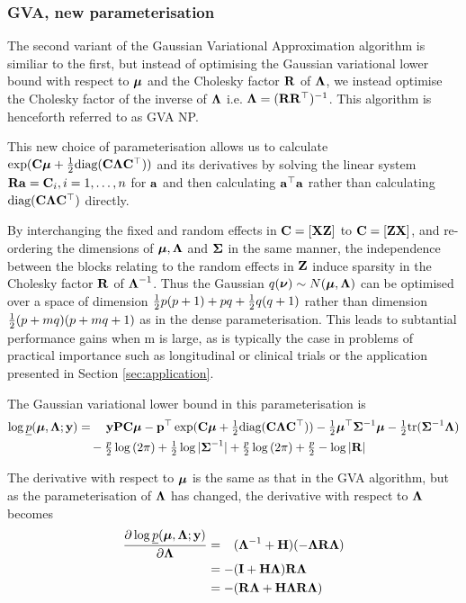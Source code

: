 \documentclass{article}[12pt]
\begin{document}
\subsubsection{GVA, new parameterisation}

The second variant of the Gaussian Variational Approximation algorithm is similiar to the first, but instead
of optimising the Gaussian variational lower bound with respect to ${\boldsymbol \mu}$ and the Cholesky factor ${\bf R}$ of
${\boldsymbol \Lambda}$, we instead optimise the Cholesky factor of the inverse of ${\boldsymbol \Lambda}$ i.e. ${\boldsymbol \Lambda} = ({\bf R}
{\bf R}^\top)^{-1}$. This algorithm is henceforth referred to as GVA NP.

This new choice of parameterisation allows us to calculate $\exp({\bf C} {\boldsymbol \mu} + {\tfrac{1}{2}} \text{diag}({\bf C} {\boldsymbol \Lambda}
{\bf C}^\top))$ and its derivatives by solving the linear system ${\bf R} {\bf a} = {\bf C}_{i}, i=1, \ldots, n$ for ${\bf a}$ and
then calculating ${\bf a}^\top{\bf a}$ rather than calculating $\text{diag}({\bf C} {\boldsymbol \Lambda} {\bf C}^\top)$ directly.

By interchanging the fixed and random effects in ${\bf C} = [{\bf X} {\bf Z}]$ to ${\bf C} = [{\bf Z} {\bf X}]$, and re- ordering the
dimensions of ${\boldsymbol \mu}, {\boldsymbol \Lambda}$ and ${\boldsymbol \Sigma}$ in the same manner, the independence between the blocks relating
to the random effects in ${\bf Z}$ induce sparsity in the Cholesky factor ${\bf R}$ of ${\boldsymbol \Lambda}^{-1}$. Thus the
Gaussian $q({\boldsymbol \nu}) \sim N({\boldsymbol \mu}, {\boldsymbol \Lambda})$ can be optimised over a space of dimension ${\tfrac{1}{2}} p (p + 1) + pq +
{\tfrac{1}{2}} q (q + 1)$ rather than dimension ${\tfrac{1}{2}} (p + mq) (p + mq + 1)$ as in the dense parameterisation. This
leads to subtantial performance gains when m is large, as is typically the case in problems of practical
importance such as longitudinal or clinical trials or the application presented in Section
\ref{sec:application}.

The Gaussian variational lower bound in this parameterisation is
\begin{align*}
\log \underline{p}({\boldsymbol \mu}, {\boldsymbol \Lambda}; {\bf y}) &= \quad {\bf y}{\bf P}{\bf C} {\boldsymbol\mu} - {\bf p}^\top \exp({\bf C} {\boldsymbol \mu} + {\tfrac{1}{2}} \text{diag}({\bf C} {\boldsymbol \Lambda} {\bf C}^\top)) - {\tfrac{1}{2}} {\boldsymbol \mu}^\top {\boldsymbol\Sigma}^{-1} {\boldsymbol \mu} - {\tfrac{1}{2}} \text{tr}{({\boldsymbol\Sigma}^{-1} {\boldsymbol\Lambda})} \\
&\quad- \tfrac{p}{2} \log{(2 \pi)} + {\tfrac{1}{2}} \log{|{\boldsymbol\Sigma}^{-1}|} + \tfrac{p}{2} \log{(2 \pi)} + \tfrac{p}{2} - \log{|{\bf R}|}
\end{align*}

The derivative with respect to ${\boldsymbol \mu}$ is the same as that in the GVA algorithm, but as the parameterisation of
${\boldsymbol \Lambda}$ has changed, the  derivative with respect to ${\boldsymbol \Lambda}$ becomes
\begin{align*}
\frac{\partial \log \underline{p}({\boldsymbol \mu}, {\boldsymbol \Lambda}; {\bf y})}{\partial {\boldsymbol\Lambda}}
&= \hphantom{-}({\boldsymbol \Lambda}^{-1} + {\bf H})(-{\boldsymbol \Lambda} {\bf R} {\boldsymbol \Lambda}) \\
&= -({\bf I} + {\bf H}{\boldsymbol \Lambda}){\bf R}{\boldsymbol \Lambda} \\
&= - ({\bf R}{\boldsymbol \Lambda} + {\bf H}{\boldsymbol \Lambda}{\bf R}{\boldsymbol \Lambda})
\end{align*} 
\end{document}
